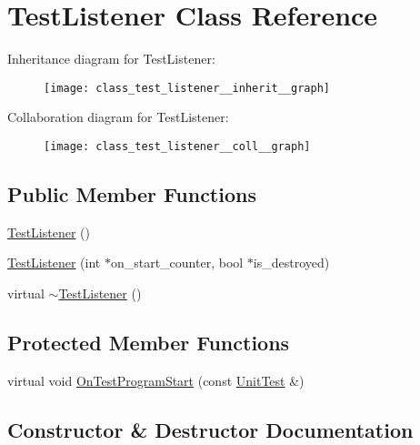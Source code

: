 \hypertarget{class_test_listener}{}\section{Test\+Listener Class Reference}
\label{class_test_listener}


Inheritance diagram for Test\+Listener\+:
\nopagebreak
\begin{figure}[H]
\begin{center}
\leavevmode
\texttt{[image: class\_test\_listener\_\_inherit\_\_graph]}
\end{center}
\end{figure}


Collaboration diagram for Test\+Listener\+:
\nopagebreak
\begin{figure}[H]
\begin{center}
\leavevmode
\texttt{[image: class\_test\_listener\_\_coll\_\_graph]}
\end{center}
\end{figure}
\subsection*{Public Member Functions}
\begin{DoxyCompactItemize}
\item 
\hyperlink{class_test_listener_ae20c874ce92777371de6d024df229e9f}{Test\+Listener} ()
\item 
\hyperlink{class_test_listener_ab65604c6c3742c494e9378e770da5d42}{Test\+Listener} (int $\ast$on\+\_\+start\+\_\+counter, bool $\ast$is\+\_\+destroyed)
\item 
virtual \hyperlink{class_test_listener_ae59dec3ae673618185eebf71881902e9}{$\sim$\+Test\+Listener} ()
\end{DoxyCompactItemize}
\subsection*{Protected Member Functions}
\begin{DoxyCompactItemize}
\item 
virtual void \hyperlink{class_test_listener_a6218f522f5b6b37050ff0ea630ac5fd3}{On\+Test\+Program\+Start} (const \hyperlink{classtesting_1_1_unit_test}{Unit\+Test} \&)
\end{DoxyCompactItemize}


\subsection{Constructor \& Destructor Documentation}
